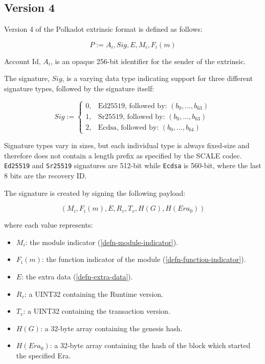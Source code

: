 \subsection{Version 4}

Version 4 of the Polkadot extrinsic format is defined as follows:

\[
    P := A_i, Sig, E, M_i, F_i(m)
\]

\begin{definition}
    Account Id, $A_i$, is an opaque 256-bit identifier for the sender of the
    extrinsic.
\end{definition}

\begin{definition}
    The signature, $Sig$, is a varying data type indicating support for three
    different signature types, followed by the signature itself:

    \[
        Sig :=
        \begin{cases}
        0, & \text{Ed25519, followed by: } (b_0, ...,b_{63}) \\
        1, & \text{Sr25519, followed by: } (b_0, ...,b_{63}) \\
        2, & \text{Ecdsa, followed by: } (b_0, ...,b_{64})
        \end{cases}
    \]

    Signature types vary in sizes, but each individual type is always fixed-size
    and therefore does not contain a length prefix as specified by the SCALE
    codec. \verb|Ed25519| and \verb|Sr25519| signatures are 512-bit while
    \verb|Ecdsa| is 560-bit, where the last 8 bits are the recovery ID.
    \newline

    The signature is created by signing the following payload:

    \[
        (M_i, F_i(m), E, R_v, T_v, H(G), H(Era_0))
    \]

    where each value represents:
    \begin{itemize}
        \item $M_i$: the module indicator (\ref{defn-module-indicator}).
        \item $F_i(m)$: the function indicator of the module (\ref{defn-function-indicator}).
        \item $E$: the extra data (\ref{defn-extra-data}).
        \item $R_v$: a UINT32 containing the Runtime version.
        \item $T_v$: a UINT32 containing the transaction version.
        \item $H(G)$: a 32-byte array containing the genesis hash.
        \item $H(Era_0)$: a 32-byte array containing the hash of the block which started the specified Era.
    \end{itemize}
\end{definition}

